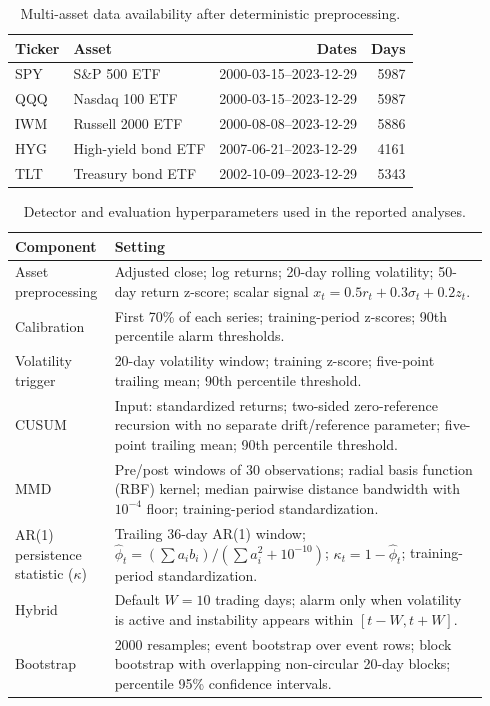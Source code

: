 \documentclass[10pt,twocolumn]{article}
\begin{document}
\begin{table}[t]
\centering
\caption{Multi-asset data availability after deterministic preprocessing.}
\label{tab:asset_availability}
\scriptsize
\begin{tabular}{llrr}
\toprule
Ticker & Asset & Dates & Days\\
\midrule
SPY & S\&P 500 ETF & 2000-03-15--2023-12-29 & 5987\\
QQQ & Nasdaq 100 ETF & 2000-03-15--2023-12-29 & 5987\\
IWM & Russell 2000 ETF & 2000-08-08--2023-12-29 & 5886\\
HYG & High-yield bond ETF & 2007-06-21--2023-12-29 & 4161\\
TLT & Treasury bond ETF & 2002-10-09--2023-12-29 & 5343\\
\bottomrule
\end{tabular}
\end{table}

\begin{table}[t]
\centering
\caption{Detector and evaluation hyperparameters used in the reported analyses.}
\label{tab:hyperparams}
\scriptsize
\begin{tabular}{p{0.18\linewidth}p{0.76\linewidth}}
\toprule
Component & Setting \\
\midrule
Asset preprocessing & Adjusted close; log returns; 20-day rolling volatility; 50-day return z-score; scalar signal $x_t=0.5r_t+0.3\sigma_t+0.2z_t$.\\
Calibration & First 70\% of each series; training-period z-scores; 90th percentile alarm thresholds.\\
Volatility trigger & 20-day volatility window; training z-score; five-point trailing mean; 90th percentile threshold.\\
CUSUM & Input: standardized returns; two-sided zero-reference recursion with no separate drift/reference parameter; five-point trailing mean; 90th percentile threshold.\\
MMD & Pre/post windows of 30 observations; radial basis function (RBF) kernel; median pairwise distance bandwidth with $10^{-4}$ floor; training-period standardization.\\
AR(1) persistence statistic ($\kappa$) & Trailing 36-day AR(1) window; $\widehat\phi_t=(\sum a_i b_i)/(\sum a_i^2+10^{-10})$; $\kappa_t=1-\widehat\phi_t$; training-period standardization.\\
Hybrid & Default $W=10$ trading days; alarm only when volatility is active and instability appears within $[t-W,t+W]$.\\
Bootstrap & 2000 resamples; event bootstrap over event rows; block bootstrap with overlapping non-circular 20-day blocks; percentile 95\% confidence intervals.\\
\bottomrule
\end{tabular}
\end{table}
\end{document}
